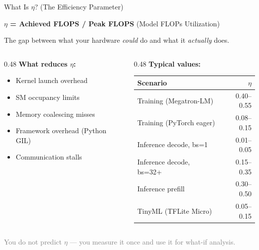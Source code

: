 \documentclass[aspectratio=169, 12pt]{beamer}
\begin{document}
\begin{frame}{What Is $\eta$? (The Efficiency Parameter)}

\small
\textbf{$\eta$ = Achieved FLOPS / Peak FLOPS} (Model FLOPs Utilization)

\vspace{0.3cm}
The gap between what your hardware \emph{could} do and what it \emph{actually} does.

\vspace{0.3cm}
\begin{columns}[T]
\begin{column}{0.48\textwidth}
\textbf{What reduces $\eta$:}
\begin{itemize}\setlength\itemsep{1pt}
\item Kernel launch overhead
\item SM occupancy limits
\item Memory coalescing misses
\item Framework overhead (Python GIL)
\item Communication stalls
\end{itemize}
\end{column}
\begin{column}{0.48\textwidth}
\textbf{Typical values:}

\scriptsize
\begin{tabular}{@{}lr@{}}
\toprule
Scenario & $\eta$ \\
\midrule
Training (Megatron-LM) & 0.40--0.55 \\
Training (PyTorch eager) & 0.08--0.15 \\
Inference decode, bs=1 & 0.01--0.05 \\
Inference decode, bs=32+ & 0.15--0.35 \\
Inference prefill & 0.30--0.50 \\
TinyML (TFLite Micro) & 0.05--0.15 \\
\bottomrule
\end{tabular}
\end{column}
\end{columns}

\vfill
\centering
\small\textcolor{gray}{You do not predict $\eta$ --- you measure it once and use it for what-if analysis.}
\end{frame}
\end{document}
